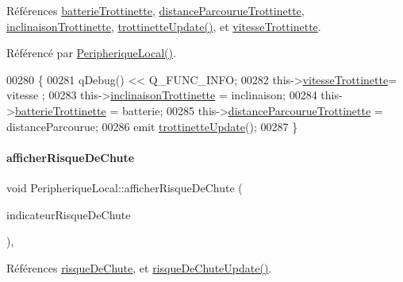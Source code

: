 Références \hyperlink{class_peripherique_local_a7feac59a6fbe481321aa1734d13f05c2}{batterie\+Trottinette}, \hyperlink{class_peripherique_local_a6b583dc9b350baf3edcc0cbc1611a6c5}{distance\+Parcourue\+Trottinette}, \hyperlink{class_peripherique_local_ab85a254ce801dcdebd6be972aea0638b}{inclinaison\+Trottinette}, \hyperlink{class_peripherique_local_af93a0559c563c2a9489a6c78468af6f1}{trottinette\+Update()}, et \hyperlink{class_peripherique_local_aa0a0ebf6468e8a2c3a15828122ee830a}{vitesse\+Trottinette}.



Référencé par \hyperlink{class_peripherique_local_a99a652b8659a3692f164cf1a0382e4bf}{Peripherique\+Local()}.


\begin{DoxyCode}
00280 \{
00281     qDebug() << Q\_FUNC\_INFO;
00282     this->\hyperlink{class_peripherique_local_aa0a0ebf6468e8a2c3a15828122ee830a}{vitesseTrottinette}= vitesse ;
00283     this->\hyperlink{class_peripherique_local_ab85a254ce801dcdebd6be972aea0638b}{inclinaisonTrottinette} = inclinaison;
00284     this->\hyperlink{class_peripherique_local_a7feac59a6fbe481321aa1734d13f05c2}{batterieTrottinette} = batterie;
00285     this->\hyperlink{class_peripherique_local_a6b583dc9b350baf3edcc0cbc1611a6c5}{distanceParcourueTrottinette} = distanceParcourue;
00286     emit \hyperlink{class_peripherique_local_af93a0559c563c2a9489a6c78468af6f1}{trottinetteUpdate}();
00287 \}
\end{DoxyCode}
\mbox{\label{class_peripherique_local_ac20ba20d69997e441b1b782f8b506291}} 
\paragraph{\texorpdfstring{afficher\+Risque\+De\+Chute}{afficherRisqueDeChute}}
{\footnotesize\ttfamily void Peripherique\+Local\+::afficher\+Risque\+De\+Chute (\begin{DoxyParamCaption}\item[{Q\+String}]{indicateur\+Risque\+De\+Chute }\end{DoxyParamCaption})\hspace{0.3cm}{\ttfamily [protected]}, {\ttfamily [slot]}}



Références \hyperlink{class_peripherique_local_a79a43778c2db1c9c70784b6329dc383e}{risque\+De\+Chute}, et \hyperlink{class_peripherique_local_a4c2e32ed7feda45c6347144a99be7525}{risque\+De\+Chute\+Update()}.



